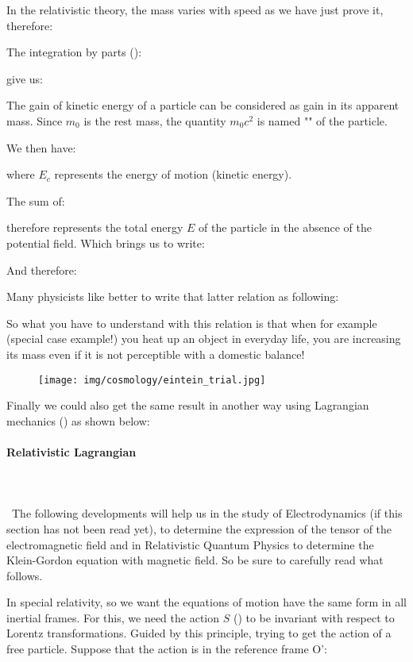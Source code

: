 	In the relativistic theory, the mass varies with speed as we have just prove it, therefore:
	
	The integration by parts ():
	
	give us:
	
	The gain of kinetic energy of a particle can be considered as gain in its apparent mass. Since $m_0$ is the rest mass, the quantity $m_0c^2$ is named "" of the particle.

	We then have:
	
	where $E_c$ represents the energy of motion (kinetic energy).

	The sum of:
	
	therefore represents the total energy $E$ of the particle in the absence of the potential field. Which brings us to write:
	
	And therefore:
	
	Many physicists like better to write that latter relation as following:
	
	So what you have to understand with this relation is that when for example (special case example!) you heat up an object in everyday life, you are increasing its mass even if it is not perceptible with a domestic balance!
	\begin{figure}[H]
		\centering
		\texttt{[image: img/cosmology/eintein\_trial.jpg]}
	\end{figure}
	Finally we could also get the same result in another way using Lagrangian mechanics () as shown below:
	
	\paragraph{Relativistic Lagrangian}\label{relativistic lagrangien}\mbox{}\\\\\
	The following developments will help us in the study of Electrodynamics (if this section has not been read yet), to determine the expression of the tensor of the electromagnetic field and in Relativistic Quantum Physics to determine the Klein-Gordon equation with magnetic field. So be sure to carefully read what follows.

	In special relativity, so we want the equations of motion have the same form in all inertial frames. For this, we need the action $S$ () to be invariant with respect to Lorentz transformations. Guided by this principle, trying to get the action of a free particle. Suppose that the action is in the reference frame O':
	
